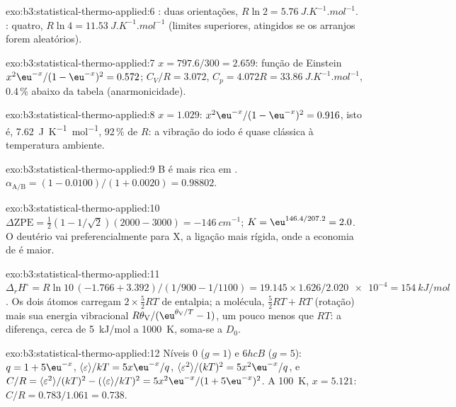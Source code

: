 \begin{solution}{exo:b3:statistical-thermo-applied:6}
: duas orientações, $R\ln2 = \qty{5.76}{J.K^{-1}.mol^{-1}}$. : quatro, $R\ln4 =
\qty{11.53}{J.K^{-1}.mol^{-1}}$ (limites superiores, atingidos se os arranjos forem aleatórios).
\end{solution}

\begin{solution}{exo:b3:statistical-thermo-applied:7}
$x = 797.6/300 = 2.659$: função de Einstein $x^2\eu^{-x}/(1 - \eu^{-x})^2 = 0.572$; $C_V/R = 3.072$,
$C_p = 4.072R = \qty{33.86}{J.K^{-1}.mol^{-1}}$, 0.4\,\% abaixo da tabela (anarmonicidade).
\end{solution}

\begin{solution}{exo:b3:statistical-thermo-applied:8}
$x = 1.029$: $x^2\eu^{-x}/(1 - \eu^{-x})^2 = 0.916$, isto é, \qty{7.62}{J.K^{-1}.mol^{-1}}, 92\,\% de $R$: a
vibração do iodo é quase clássica à temperatura ambiente.
\end{solution}

\begin{solution}{exo:b3:statistical-thermo-applied:9}
B é mais rica em . $\alpha_{\mathrm{A/B}} = (1 - 0.0100)/(1 + 0.0020) = 0.98802$.
\end{solution}

\begin{solution}{exo:b3:statistical-thermo-applied:10}
$\Delta\mathrm{ZPE} = \frac12(1 - 1/\sqrt2)(2000 - 3000) = \qty{-146}{cm^{-1}}$; $K = \eu^{146.4/207.2} = 2.0$.
O deutério vai preferencialmente para X, a ligação mais rígida, onde a economia de
 é maior.
\end{solution}

\begin{solution}{exo:b3:statistical-thermo-applied:11}
$\Delta_rH^\circ = R\ln10\,(-1.766 + 3.392)/(1/900 - 1/1100) = 19.145 \times 1.626/\num{2.020e-4} =
\qty{154}{kJ/mol}$. Os dois átomos carregam $2 \times \frac52RT$ de entalpia; a molécula, $\frac52RT + RT$
(rotação) mais sua energia vibracional $R\theta_{\mathrm V}/(\eu^{\theta_{\mathrm V}/T} - 1)$, um pouco menos que $RT$:
a diferença, cerca de \qty{5}{kJ/mol} a \qty{1000}{K}, soma-se a $D_0$.
\end{solution}

\begin{solution}{exo:b3:statistical-thermo-applied:12}
Níveis 0 ($g = 1$) e $6hcB$ ($g = 5$): $q = 1 + 5\eu^{-x}$, $\langle\varepsilon\rangle/kT = 5x\eu^{-x}/q$, $\langle\varepsilon^2\rangle/(kT)^2 =
5x^2\eu^{-x}/q$, e $C/R = \langle\varepsilon^2\rangle/(kT)^2 - (\langle\varepsilon\rangle/kT)^2 = 5x^2\eu^{-x}/(1 + 5\eu^{-x})^2$. A
\qty{100}{K}, $x = 5.121$: $C/R = 0.783/1.061 = 0.738$.
\end{solution}

